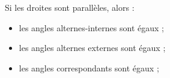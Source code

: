 Si les droites sont parallèles, alors :
\begin{itemize}
    \item les angles alternes-internes sont égaux ;
    \item les angles alternes externes sont égaux ;
    \item les angles correspondants sont égaux ;
\end{itemize}